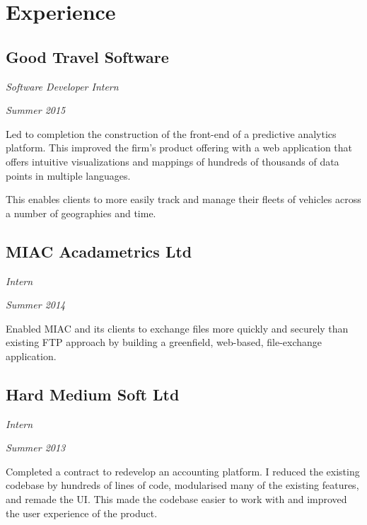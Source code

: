 \section*{Experience}

\subsection*{Good Travel Software}
\noindent\begin{minipage}[b]{0.5\textwidth}
  \flushleft
  \emph{Software Developer Intern}
\end{minipage}
\noindent\begin{minipage}[b]{0.5\textwidth}
  \flushright
  \emph{Summer 2015}
\end{minipage}

Led to completion the construction of the front-end of a predictive analytics platform. This improved the firm's product offering with a web application that offers intuitive visualizations and mappings of hundreds of thousands of data points in multiple languages.

This enables clients to more easily track and manage their fleets of vehicles across a number of geographies and time.

\subsection*{MIAC Acadametrics Ltd}
\noindent\begin{minipage}[b]{0.5\textwidth}
  \flushleft
  \emph{Intern}
\end{minipage}
\noindent\begin{minipage}[b]{0.5\textwidth}
  \flushright
  \emph{Summer 2014}
\end{minipage}

Enabled MIAC and its clients to exchange files more quickly and securely than existing FTP approach by building a greenfield, web-based, file-exchange application.

\subsection*{Hard Medium Soft Ltd}
\noindent\begin{minipage}[b]{0.5\textwidth}
  \flushleft
  \emph{Intern}
\end{minipage}
\noindent\begin{minipage}[b]{0.5\textwidth}
  \flushright
  \emph{Summer 2013}
\end{minipage}

Completed a contract to redevelop an accounting platform. I reduced the existing codebase by hundreds of lines of code, modularised many of the existing features, and remade the UI. This made the codebase easier to work with and improved the user experience of the product.

